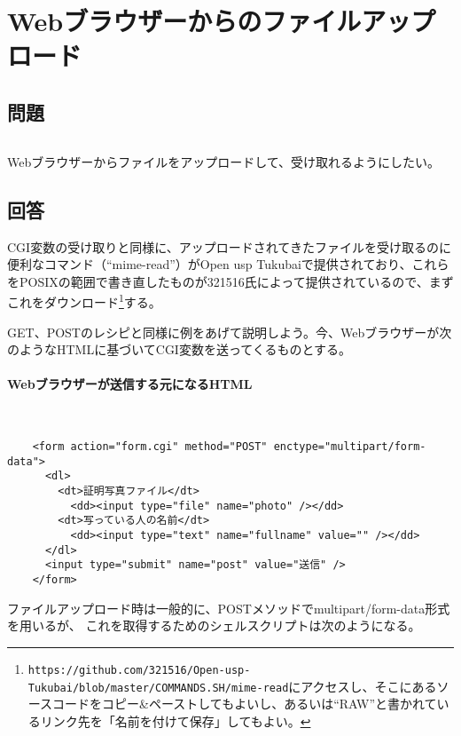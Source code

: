 \section{Webブラウザーからのファイルアップロード}
\label{recipe:file_upload}

\subsection*{問題}
\noindent
$\!\!\!\!\!$
\begin{grshfboxit}{160.0mm}
	Webブラウザーからファイルをアップロードして、受け取れるようにしたい。
\end{grshfboxit}

\subsection*{回答}
CGI変数の受け取りと同様に、アップロードされてきたファイルを受け取るのに便利なコマンド（``mime-read''）がOpen usp Tukubaiで提供されており、これらをPOSIXの範囲で書き直したものが321516氏によって提供されているので、まずこれをダウンロード\footnote{\verb|https://github.com/321516/Open-usp-Tukubai/blob/master/COMMANDS.SH/mime-read|にアクセスし、そこにあるソースコードをコピー\&{}ペーストしてもよいし、あるいは``RAW''と書かれているリンク先を「名前を付けて保存」してもよい。}する。

GET、POSTのレシピと同様に例をあげて説明しよう。今、Webブラウザーが次のようなHTMLに基づいてCGI変数を送ってくるものとする。
\paragraph{Webブラウザーが送信する元になるHTML} 　\\
\begin{frameboxit}{160.0mm}
\begin{verbatim}
	<form action="form.cgi" method="POST" enctype="multipart/form-data">
	  <dl>
	    <dt>証明写真ファイル</dt>
	      <dd><input type="file" name="photo" /></dd>
	    <dt>写っている人の名前</dt>
	      <dd><input type="text" name="fullname" value="" /></dd>
	  </dl>
	  <input type="submit" name="post" value="送信" />
	</form>
\end{verbatim}
\end{frameboxit}

ファイルアップロード時は一般的に、POSTメソッドでmultipart/form-data形式を用いるが、
これを取得するためのシェルスクリプトは次のようになる。
